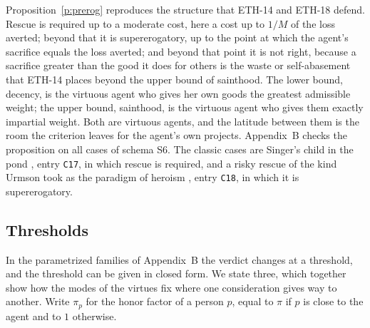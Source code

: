 \documentclass{situationist-preprint}
\begin{document}
Proposition~\ref{p:prerog} reproduces the structure that ETH-14 and ETH-18 defend. Rescue is required up to a moderate cost, here a cost up to $1/M$ of the loss averted; beyond that it is supererogatory, up to the point at which the agent's sacrifice equals the loss averted; and beyond that point it is not right, because a sacrifice greater than the good it does for others is the waste or self-abasement that ETH-14 places beyond the upper bound of sainthood. The lower bound, decency, is the virtuous agent who gives her own goods the greatest admissible weight; the upper bound, sainthood, is the virtuous agent who gives them exactly impartial weight. Both are virtuous agents, and the latitude between them is the room the criterion leaves for the agent's own projects. Appendix~B checks the proposition on all \stnschsix{} cases of schema S6. The classic cases are Singer's child in the pond \citep{Singer1972}, entry \texttt{C17}, in which rescue is required, and a risky rescue of the kind Urmson took as the paradigm of heroism \citep{Urmson1958}, entry \texttt{C18}, in which it is supererogatory.

\subsection{Thresholds}

In the parametrized families of Appendix~B the verdict changes at a threshold, and the threshold can be given in closed form. We state three, which together show how the modes of the virtues fix where one consideration gives way to another. Write $\pi_p$ for the honor factor of a person $p$, equal to $\pi$ if $p$ is close to the agent and to $1$ otherwise.
\end{document}
